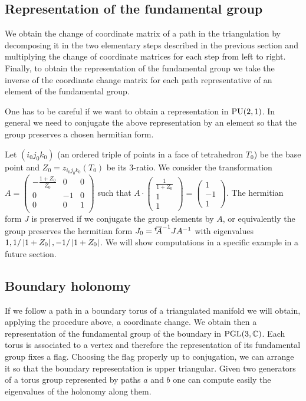 \subsection{Representation of the fundamental group}

We  obtain the change of coordinate matrix of a path in the triangulation by decomposing it in the
two elementary steps described in the previous section and multiplying the change of coordinate matrices for each step from left to right.
Finally, to obtain the representation of the fundamental group we take the inverse of the coordinate change matrix for each path
representative of an element of the fundamental group.

One has to be careful if we want to obtain a representation in $\textrm{PU}(2,1)$.
In general we need to conjugate the above representation by an element so that the group preserves a
chosen hermitian form.

Let %
$(i_0j_0k_0)$ (an ordered triple of points in a face of tetrahedron $T_0$)  be the base point and $Z_0 = z_{i_0j_0k_0}(T_0)$ be its 3-ratio.
We consider the transformation
$
A= \begin{pmatrix}
-\frac{1+Z_0}{Z_0} &  0 & 0 \\
0 & -1 & 0  \\
0 & 0 & 1 \\
\end{pmatrix}
$
such that
$
A \cdot
\left (\begin{matrix}\frac{1}{1+Z_0} \\1 \\1\end{matrix} \right)=
\left(\begin{matrix}1 \\-1\\1\end{matrix}\right).$
The hermitian form $J$ is preserved if we conjugate the group elements by $A$,
or equivalently the group preserves the hermitian form
$J_0 =\hbox{}^{t}\! \overline{A}^{-1} J A^{-1}$ with eigenvalues $1,  1/\left \vert 1+Z_0 \right \vert, -1/\left \vert 1+Z_0 \right \vert$.
We will show computations in a specific example in a future section.

\subsection{Boundary holonomy}
If we follow a path in a boundary torus of a triangulated manifold we will obtain, applying the procedure above, a coordinate change.  We obtain then a representation of the fundamental group of the boundary in $\textrm{PGL} (3,\mathbb{C})$.
Each torus is associated to a vertex and therefore the representation of its fundamental
group fixes a flag.  Choosing the flag properly up to conjugation, we can arrange it so that the boundary representation is upper triangular.
   Given two generators of a torus group represented by paths $a$ and $b$ one can compute easily the eigenvalues of the holonomy
along them.

